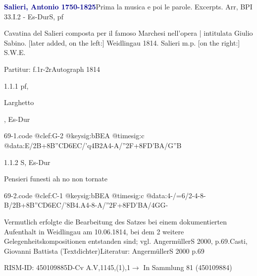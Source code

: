 \documentclass[a4paper, twocolumn, 11pt]{book}
\begin{document}
\par \vspace{16pt} \textcolor{darkblue}{\textbf{Salieri, Antonio  1750-1825}}\hfillplus{[69]}\newline Prima la musica e poi le parole. Excerpts. Arr, BPI 33.I.2 - Es-Dur\newline S, pf
\par \begin{itshape} Cavatina del Salieri composta per il famoso Marchesi nell'opera | intitulata Giulio Sabino. [later added, on the left:] Weidlingau 1814. Salieri m.p. [on the right:] S.W.E.\end{itshape} 
\par \textcolor{darkblue}{}  Partitur: f.1r-2r\newline Autograph  1814
\par 1.1.1  pf, \begin{itshape}Larghetto\end{itshape}, Es-Dur  
\begin{filecontents*}{69-1.code}
@clef:G-2
@keysig:bBEA
@timesig:c
@data:E/2B+{8B''C}{D6EC}/'q4B2A4-A/''2F+{8FD'BA}/{G''B}
\end{filecontents*}
\newline %
\par 1.1.2  S, Es-Dur\newline \begin{footnotesize} Pensieri funesti ah no non tornate \end{footnotesize}  
\begin{filecontents*}{69-2.code}
@clef:C-1
@keysig:bBEA
@timesig:c
@data:4-/=6/2-4-8-B/2B+{8B''C}D{6EC}/'8B4.A4-8-A/''2F+{8FD}'BA/4GG-
\end{filecontents*}
\newline %
\par Vermutlich erfolgte die Bearbeitung des Satzes bei einem dokumentierten Aufenthalt in Weidlingau am 10.06.1814, bei dem 2 weitere Gelegenheitskompositionen entstanden sind; vgl. AngermüllerS 2000, p.69.\newline Casti, Giovanni Battista  (Textdichter)\newline Literatur: AngermüllerS 2000  p.69
\par RISM-ID: 450109885\newline D-Cv  A.V,1145,(1),1\newline $\rightarrow$ In Sammlung 81 (450109884)
      
\end{document}
